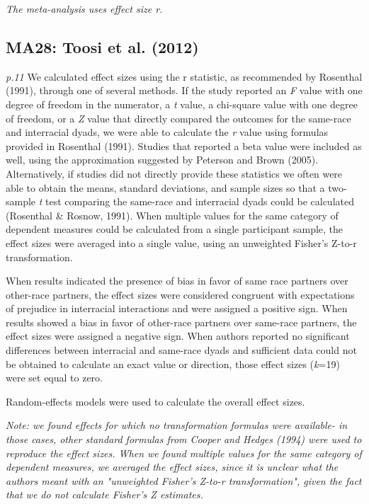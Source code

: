 \documentclass{article}
\begin{document}
\vspace{3mm}
\textit{The meta-analysis uses effect size r.}

\subsection*{MA28: Toosi et al. (2012)}

\textit{p.11} We calculated effect sizes using the r statistic, as recommended by Rosenthal (1991), through one of several methods. If the study reported an \textit{F} value with one degree of freedom in the numerator, a \textit{t} value, a chi-square value with one degree of freedom, or a \textit{Z} value that directly compared the outcomes for the same-race and interracial dyads, we were able to calculate the \textit{r} value using formulas provided in Rosenthal (1991). Studies that reported a beta value were included as well, using the approximation suggested by Peterson and Brown (2005). Alternatively, if studies did not directly provide these statistics we often were able to obtain the means, standard deviations, and sample sizes so that a two-sample \textit{t} test comparing the same-race and interracial dyads could be calculated (Rosenthal \& Rosnow, 1991). When multiple values for the same category of dependent measures could be calculated from a single participant sample, the effect sizes were averaged into a single value, using an unweighted Fisher’s Z-to-r transformation. 

When results indicated the presence of bias in favor of same race partners over other-race partners, the effect sizes were considered congruent with expectations of prejudice in interracial interactions and were assigned a positive sign. When results
showed a bias in favor of other-race partners over same-race partners, the effect sizes were assigned a negative sign. When
authors reported no significant differences between interracial and same-race dyads and sufficient data could not be obtained to
calculate an exact value or direction, those effect sizes (\textit{k}=19) were set equal to zero.

Random-effects models were used to calculate the overall effect sizes. 

\vspace{3 mm}
\textit{Note: we found effects for which no transformation formulas were available- in those cases, other standard formulas from Cooper and Hedges (1994) were used to reproduce the effect sizes. When we found multiple values for the same category of dependent measures, we averaged the effect sizes, since it is unclear what the authors meant with an "unweighted Fisher's Z-to-r transformation", given the fact that we do not calculate Fisher's Z estimates.}
\end{document}
